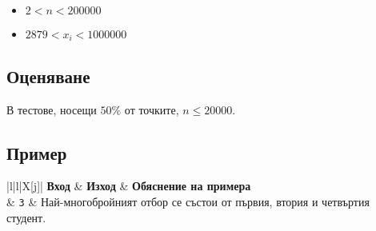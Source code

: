 \documentclass[12pt]{article}
\begin{document}
\vspace{0.1em}
\begin{itemize}
	\item $2 <  n < 200000$
    \item $2879 < x_i < 1000000$ 
\end{itemize}
\subsection{Оценяване}
 В тестове, носещи $50\%$ от точките, $n \leq 20000$. 

\subsection{Пример}

\begin{table}[ht]
	\begin{tblr}{|l|l|X[j]|}
		\hline
		\textbf{Вход} & \textbf{Изход} & \textbf{Обяснение на примера}\\
		\hline
		\texttt
            {} & \texttt{3} & Най-многобройният отбор се състои от първия, втория и четвъртия студент.\\
		\hline
	\end{tblr}
\end{table}
\end{document}
